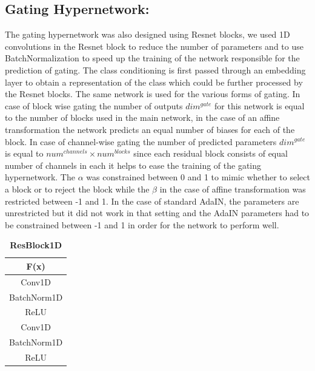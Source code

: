 \subsection{Gating Hypernetwork:}
The gating hypernetwork was also designed using Resnet blocks, we used 1D convolutions in the Resnet block  to reduce the number of parameters and to use BatchNormalization to speed up the training of the network responsible for the prediction of gating. The class conditioning is first passed through an embedding layer to obtain a representation of the class which could be further processed by the Resnet blocks. The same network is used for the various forms of gating. In case of block wise gating the number of outputs $dim^{gate}$ for this network is equal to the number of blocks used in the main network, in the case of an affine transformation the network predicts an equal number of biases for each of the block. In case of channel-wise gating the number of predicted parameters $dim^{gate}$ is equal to $num^{channels}\times num^{blocks}$ since each residual block consists of equal number of channels in each it helps to ease the training of the gating hypernetwork. The $\alpha$ was constrained between 0 and 1 to mimic whether to select a block or to reject the block while the $\beta$ in the case of affine transformation was restricted between -1 and 1. In the case of standard AdaIN, the parameters are unrestricted but it did not work in that setting and the AdaIN parameters had to be constrained between -1 and 1 in order for the network to perform well. 

\begin{table}[ht]
\caption{\textbf{ResBlock1D}} %
\centering %
\begin{tabular}{c} %
\toprule
\textbf{F(x)}\\\midrule
Conv1D\\ %
BatchNorm1D\\
ReLU \\
Conv1D\\
BatchNorm1D\\
ReLU \\
\bottomrule %
\end{tabular}
\label{table:resblock1D} %
\end{table}

